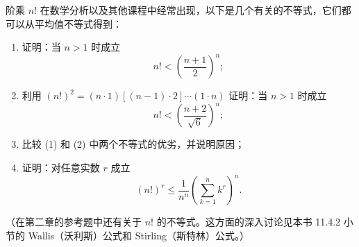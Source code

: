 \begin{xexercise}[2]
阶乘 $n!$ 在数学分析以及其他课程中经常出现，以下是几个有关的不等式，它们都可以从平均值不等式得到：
\begin{enumerate}[label=(\arabic*)]
  \item 证明：当 $n>1$ 时成立
  \[
    n!<\left(\frac{n+1}{2}\right)^n;
  \]
  \item 利用 $(n!)^2=(n\cdot1)[(n-1)\cdot2]\cdots(1\cdot n)$ 证明：当 $n>1$ 时成立
  \[
    n!<\left(\frac{n+2}{\sqrt6}\right)^n;
  \]
  \item 比较 (1) 和 (2) 中两个不等式的优劣，并说明原因；
  \item 证明：对任意实数 $r$ 成立
  \[
    (n!)^r\le \frac1{n^n}\left(\sum_{k=1}^n k^r\right)^n.
  \]
\end{enumerate}

（在第二章的参考题中还有关于 $n!$ 的不等式。这方面的深入讨论见本书 11.4.2 小节的 Wallis（沃利斯）公式和 Stirling（斯特林）公式。）
\end{xexercise}
